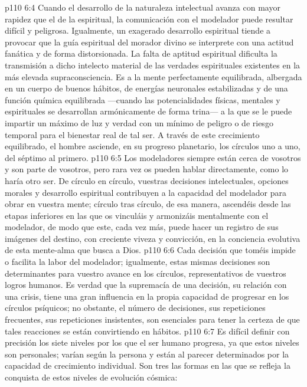 \vs p110 6:4 Cuando el desarrollo de la naturaleza intelectual avanza con mayor rapidez que el de la espiritual, la comunicación con el modelador puede resultar difícil y peligrosa. Igualmente, un exagerado desarrollo espiritual tiende a provocar que la guía espiritual del morador divino se interprete con una actitud fanática y de forma distorsionada. La falta de aptitud espiritual dificulta la transmisión a dicho intelecto material de las verdades espirituales existentes en la más elevada supraconsciencia. Es a la mente perfectamente equilibrada, albergada en un cuerpo de buenos hábitos, de energías neuronales estabilizadas y de una función química equilibrada ---cuando las potencialidades físicas, mentales y espirituales se desarrollan armónicamente de forma trina--- a la que se le puede impartir un máximo de luz y verdad con un mínimo de peligro o de riesgo temporal para el bienestar real de tal ser. A través de este crecimiento equilibrado, el hombre asciende, en su progreso planetario, los círculos uno a uno, del séptimo al primero.
\vs p110 6:5 \pc Los modeladores siempre están cerca de vosotros y son parte de vosotros, pero rara vez os pueden hablar directamente, como lo haría otro ser. De círculo en círculo, vuestras decisiones intelectuales, opciones morales y desarrollo espiritual contribuyen a la capacidad del modelador para obrar en vuestra mente; círculo tras círculo, de esa manera, ascendéis desde las etapas inferiores en las que os vinculáis y armonizáis mentalmente con el modelador, de modo que este, cada vez más, puede hacer un registro de sus imágenes del destino, con creciente viveza y convicción, en la conciencia evolutiva de esta mente\hyp{}alma que busca a Dios.
\vs p110 6:6 \pc Cada decisión que toméis impide o facilita la labor del modelador; igualmente, estas mismas decisiones son determinantes para vuestro avance en los círculos, representativos de vuestros logros humanos. Es verdad que la supremacía de una decisión, su relación con una crisis, tiene una gran influencia en la propia capacidad de progresar en los círculos psíquicos; no obstante, el número de decisiones, sus repeticiones frecuentes, sus repeticiones insistentes, son esenciales para tener la certeza de que tales reacciones se están convirtiendo en hábitos.
\vs p110 6:7 Es difícil definir con precisión los siete niveles por los que el ser humano progresa, ya que estos niveles son personales; varían según la persona y están al parecer determinados por la capacidad de crecimiento individual. Son tres las formas en las que se refleja la conquista de estos niveles de evolución cósmica:
